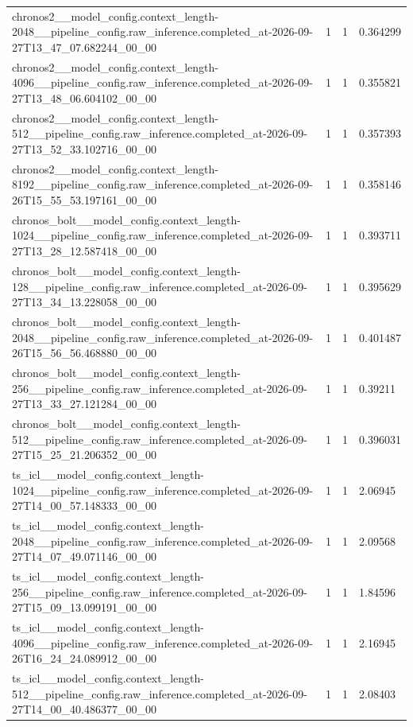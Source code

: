 \begin{tabular}{llll}
chronos2\_\_model\_config.context\_length-2048\_\_pipeline\_config.raw\_inference.completed\_at-2026-09-27T13\_47\_07.682244\_00\_00 & 1 & 1 & 0.364299 \\
chronos2\_\_model\_config.context\_length-4096\_\_pipeline\_config.raw\_inference.completed\_at-2026-09-27T13\_48\_06.604102\_00\_00 & 1 & 1 & 0.355821 \\
chronos2\_\_model\_config.context\_length-512\_\_pipeline\_config.raw\_inference.completed\_at-2026-09-27T13\_52\_33.102716\_00\_00 & 1 & 1 & 0.357393 \\
chronos2\_\_model\_config.context\_length-8192\_\_pipeline\_config.raw\_inference.completed\_at-2026-09-26T15\_55\_53.197161\_00\_00 & 1 & 1 & 0.358146 \\
chronos\_bolt\_\_model\_config.context\_length-1024\_\_pipeline\_config.raw\_inference.completed\_at-2026-09-27T13\_28\_12.587418\_00\_00 & 1 & 1 & 0.393711 \\
chronos\_bolt\_\_model\_config.context\_length-128\_\_pipeline\_config.raw\_inference.completed\_at-2026-09-27T13\_34\_13.228058\_00\_00 & 1 & 1 & 0.395629 \\
chronos\_bolt\_\_model\_config.context\_length-2048\_\_pipeline\_config.raw\_inference.completed\_at-2026-09-26T15\_56\_56.468880\_00\_00 & 1 & 1 & 0.401487 \\
chronos\_bolt\_\_model\_config.context\_length-256\_\_pipeline\_config.raw\_inference.completed\_at-2026-09-27T13\_33\_27.121284\_00\_00 & 1 & 1 & 0.39211 \\
chronos\_bolt\_\_model\_config.context\_length-512\_\_pipeline\_config.raw\_inference.completed\_at-2026-09-27T15\_25\_21.206352\_00\_00 & 1 & 1 & 0.396031 \\
ts\_icl\_\_model\_config.context\_length-1024\_\_pipeline\_config.raw\_inference.completed\_at-2026-09-27T14\_00\_57.148333\_00\_00 & 1 & 1 & 2.06945 \\
ts\_icl\_\_model\_config.context\_length-2048\_\_pipeline\_config.raw\_inference.completed\_at-2026-09-27T14\_07\_49.071146\_00\_00 & 1 & 1 & 2.09568 \\
ts\_icl\_\_model\_config.context\_length-256\_\_pipeline\_config.raw\_inference.completed\_at-2026-09-27T15\_09\_13.099191\_00\_00 & 1 & 1 & 1.84596 \\
ts\_icl\_\_model\_config.context\_length-4096\_\_pipeline\_config.raw\_inference.completed\_at-2026-09-26T16\_24\_24.089912\_00\_00 & 1 & 1 & 2.16945 \\
ts\_icl\_\_model\_config.context\_length-512\_\_pipeline\_config.raw\_inference.completed\_at-2026-09-27T14\_00\_40.486377\_00\_00 & 1 & 1 & 2.08403 \\

\end{tabular}
